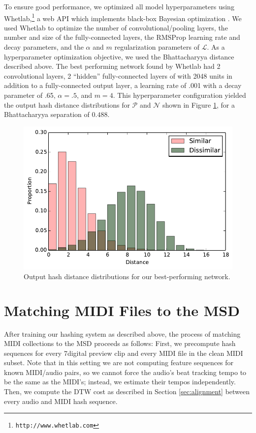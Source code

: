 \documentclass{article}
\begin{document}
To ensure good performance, we optimized all model hyperparameters using Whetlab,\footnote{\texttt{http://www.whetlab.com}} a web API which implements black-box Bayesian optimization \cite{snoek2012practical}.
We used Whetlab to optimize the number of convolutional/pooling layers, the number and size of the fully-connected layers, the RMSProp learning rate and decay parameters, and the $\alpha$ and $m$ regularization parameters of $\mathcal{L}$.
As a hyperparameter optimization objective, we used the Bhattacharyya distance described above.
The best performing network found by Whetlab had 2 convolutional layers, 2 ``hidden'' fully-connected layers of with 2048 units in addition to a fully-connected output layer, a learning rate of .001 with a decay parameter of .65, $\alpha = .5$, and $m = 4$.
This hyperparameter configuration yielded the output hash distance distributions for $\mathcal{P}$ and $\mathcal{N}$ shown in Figure \ref{fig:distances}, for a Bhattacharyya separation of $0.488$.

\begin{figure}
  \includegraphics[width=\columnwidth]{hash_distributions.pdf}
  \caption{Output hash distance distributions for our best-performing network.}
  \label{fig:distances}
\end{figure}

\section{Matching MIDI Files to the MSD}
\label{sec:msd}

After training our hashing system as described above, the process of matching MIDI collections to the MSD proceeds as follows:
First, we precompute hash sequences for every 7digital preview clip and every MIDI file in the clean MIDI subset.
Note that in this setting we are not computing feature sequences for known MIDI/audio pairs, so we cannot force the audio's beat tracking tempo to be the same as the MIDI's; instead, we estimate their tempos independently.
Then, we compute the DTW cost as described in Section \ref{sec:alignment} between every audio and MIDI hash sequence.
\end{document}
